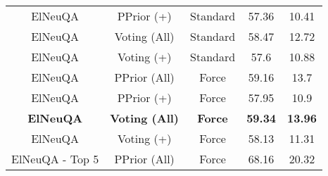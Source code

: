 \begin{table}[h!]
\begin{tabular}{|c|cc|cc|}
    ElNeuQA                          & PPrior (+)                                                                                                      & Standard                                                                            & 57.36                                    & 10.41                  \\
    ElNeuQA                          & Voting (All)                                                                                                    & Standard                                                                            & 58.47                                    & 12.72                  \\
    ElNeuQA                          & Voting (+)                                                                                                      & Standard                                                                            & 57.6                                     & 10.88                  \\ \hline
    ElNeuQA                          & PPrior (All)                                                                                                    & Force                                                                               & 59.16                                    & 13.7                   \\
    ElNeuQA                          & PPrior (+)                                                                                                      & Force                                                                               & 57.95                                    & 10.9                   \\
    \textbf{ElNeuQA}                 & \textbf{Voting (All)}                                                                                           & \textbf{Force}                                                                      & \textbf{59.34}                           & \textbf{13.96}         \\
    ElNeuQA                          & Voting (+)                                                                                                      & Force                                                                               & 58.13                                    & 11.31                  \\ \hline
    ElNeuQA - Top 5                  & PPrior (All)                                                                                                    & Force                                                                               & 68.16                                    & 20.32                  \\

\end{tabular}
\end{table}
